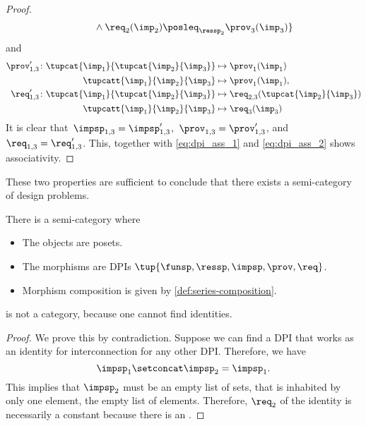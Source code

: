 \begin{proof}
\begin{equation}
\begin{aligned}
            &\qquad \wedge \req_2(\imp_2)\posleq_{\ressp_2}\prov_3(\imp_3)\}\\
        \end{aligned}
    \end{equation}
    and
    \begin{equation}
        \begin{aligned}
            \prov'_{1,3} \colon  \tupcat {\imp_{1}}{\tupcat {\imp_{2}} {\imp_{3}}}   &\mapsto\prov_{1}(\imp_{1})\\
            \tupcatt{\imp_{1}}{\imp_{2}}{\imp_{3}} &\mapsto\prov_{1}(\imp_{1}),\\
            \req'_{1,3} \colon  \tupcat {\imp_{1}}{\tupcat {\imp_{2}} {\imp_{3}}} &\mapsto\req_{2,3}(\tupcat {\imp_{2}} {\imp_{3}})\\
            \tupcatt{\imp_{1}}{\imp_{2}}{\imp_{3}}&\mapsto \req_{3}(\imp_{3})
        \end{aligned}
    \end{equation}
    It is clear that~$\impsp_{1,3}=\impsp'_{1,3}$,~$\prov_{1,3}=\prov'_{1,3}$, and~$\req_{1,3}=\req'_{1,3}$.
    This, together with \cref{eq:dpi_ass_1} and \cref{eq:dpi_ass_2} shows associativity.
\end{proof}

These two properties are sufficient to conclude that there exists a semi-category of design problems.



\begin{definition}
    \label{def:DPIcat}
    There is a semi-category \DPI where
    \begin{itemize}
        \item The objects are posets.
        \item The morphisms are DPIs $\tup{\funsp,\ressp,\impsp,\prov,\req}$.
        \item Morphism composition is given by \cref{def:series-composition}.
    \end{itemize}
\end{definition}

\begin{lemma}
    \DPI is not a category, because one cannot find identities.
\end{lemma}
\begin{proof}
    We prove this by contradiction. Suppose we can find a DPI that works as an identity for interconnection for any other DPI.
    Therefore, we have
    \begin{equation}
        \impsp_{1} \setconcat \impsp_{2} = \impsp_{1}.
    \end{equation}
    This implies that $\impsp_{2}$ must be an empty list of sets,  that is inhabited by only one element, the empty list of elements. Therefore, $\req_2$ of the identity is necessarily a constant because there is an .
\end{proof}

